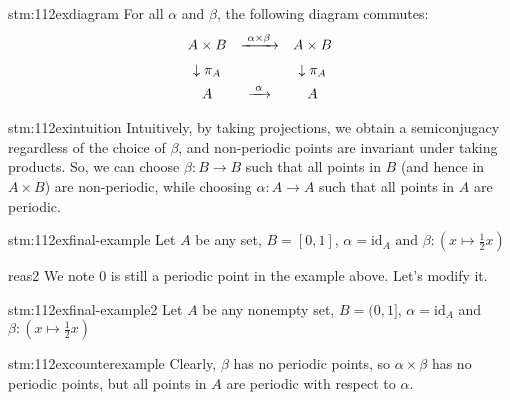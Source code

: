 \begin{statement}{stm:112exdiagram}
For all $\alpha$ and $\beta$, the following diagram commutes:
\[
\begin{array}{c@{\quad}c@{\quad}c}
A \times B & \xrightarrow{\;\alpha \times \beta\;} & A \times B\\[6pt]
\downarrow{\pi_A} && \downarrow{\pi_A}\\[4pt]
A & \xrightarrow{\;\alpha\;} & A
\end{array}
\]
\end{statement}

\begin{explanation}{stm:112exintuition}
Intuitively, by taking projections, we obtain a semiconjugacy regardless of the choice of $\beta$, and non-periodic points are invariant under taking products. So, we can choose $\beta: B \rightarrow B$ such that all points in $B$ (and hence in $A \times B$) are non-periodic, while choosing $\alpha: A \rightarrow A$ such that all points in $A$ are periodic.
\end{explanation}

\begin{explanation}{stm:112exfinal-example}
Let $A$ be any set, $B = [0,1]$, $\alpha = \mathrm{id}_A$ and $\beta: (x \mapsto \frac{1}{2}x)$
\end{explanation}

\begin{explanation}{reas2}
We note $0$ is still a periodic point in the example above. Let's modify it.
\end{explanation}

\begin{statement}{stm:112exfinal-example2}
    Let $A$ be any nonempty set, $B = (0,1]$, $\alpha = \mathrm{id}_A$ and $\beta: (x \mapsto \frac{1}{2}x)$
\end{statement}
    
\begin{statement}{stm:112excounterexample}
Clearly, $\beta$ has no periodic points, so $\alpha \times \beta$ has no periodic points, but all points in $A$ are periodic with respect to $\alpha$. 
\end{statement}